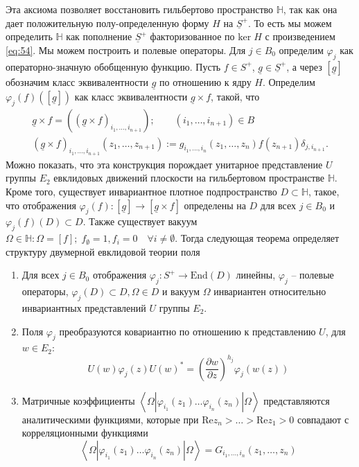 Эта аксиома позволяет восстановить гильбертово пространство $\mathbb{H}$, так как она дает положительную полу-определенную форму $H$ на $\underline{S}^{+}$. То есть мы можем определить $\mathbb{H}$ как пополнение $\underline{S}^{+}$ факторизованное по $\mathrm{ker}\; H$ с произведением \eqref{eq:54}.
Мы можем построить и полевые операторы. Для $j\in B_{0}$ определим $\varphi_{j}$ как операторно-значную обобщенную функцию. Пусть $f\in S^{+}$, $\underline{g}\in\underline{S}^{+}$, а через $[\underline{g}]$ обозначим класс эквивалентности $\underline{g}$ по отношению к ядру $H$. Определим $\varphi_{j}(f)([\underline{g}])$ как класс эквивалентности $\underline{g}\times f$, такой, что
\begin{equation}
  \label{eq:55}
  \begin{array}{l}
    \underline{g}\times f=((\underline{g}\times f)_{i_{1},\dots,i_{n+1}});\quad\quad (i_{1},\dots,i_{n+1})\in B\\
    (\underline{g}\times f)_{i_{1},\dots,i_{n+1}}(z_{1},\dots,z_{n+1}):=g_{i_{1},\dots,i_{n}}(z_{1},\dots,z_{n})f(z_{n+1})\delta_{j,i_{n+1}}.
  \end{array}
\end{equation}
Можно показать, что эта конструкция порождает унитарное представление $U$ группы $E_{2}$ евклидовых движений плоскости на гильбертовом пространстве $\mathbb{H}$. Кроме того, существует инвариантное плотное подпространство $D\subset \mathbb{H}$, такое, что отображения $\varphi_{j}(f):[\underline{g}]\to [\underline{g}\times f]$ определены на $D$ для всех $j\in B_{0}$ и $\varphi_{j}(f)(D)\subset D$. Также существует вакуум $\Omega\in\mathbb{H}: \Omega=[f];\; f_{\emptyset}=1, f_{i}=0\quad \forall i\neq \emptyset$. Тогда
следующая теорема определяет структуру двумерной евклидовой теории поля
\begin{theorem}
  \begin{enumerate}
  \item Для всех $j\in B_{0}$ отображения $\varphi_{j}:S^{+}\to \mathrm{End}(D)$ линейны, $\varphi_{j}$ -- полевые операторы, $\varphi_{j}(D)\subset D, \Omega\in D$ и вакуум $\Omega$ инвариантен относительно инвариантных представлений $U$ группы $E_{2}$.
  \item Поля $\varphi_{j}$ преобразуются ковариантно по отношению к представлению $U$, для $w\in E_{2}$:
    \begin{equation}
      \label{eq:57}
      U(w)\varphi_{j}(z)U(w)^{*}=\left(\frac{\partial w}{\partial z}\right)^{h_{j}}\varphi_{j}(w(z))
    \end{equation}
  \item Матричные коэффициенты $\left<\Omega|\varphi_{i_{1}}(z_{1})\dots \varphi_{i_{n}}(z_{n})|\Omega\right>$ представляются аналитическими функциями, которые при $\mathrm{Re}z_{n}>\dots>\mathrm{Re}z_{1}>0$ совпадают с корреляционными функциями
  \begin{equation}
    \label{eq:56}
    \left<\Omega|\varphi_{i_{1}}(z_{1})\dots \varphi_{i_{n}}(z_{n})|\Omega\right>=G_{i_{1},\dots,i_{n}}(z_{1},\dots,z_{n})
  \end{equation}
  \end{enumerate}
\end{theorem}
